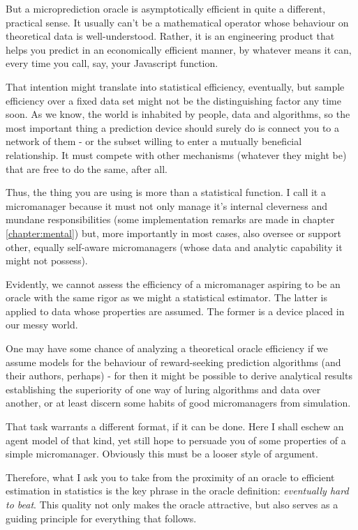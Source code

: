 But a microprediction oracle is asymptotically efficient in quite a different, practical sense. It usually can't be a mathematical operator whose behaviour on theoretical data is well-understood. Rather, it is an engineering product that helps you predict in an economically efficient manner, by whatever means it can, every time you call, say, your Javascript function. 

That intention might translate into statistical efficiency, eventually, but sample efficiency over a fixed data set might not be the distinguishing factor any time soon. As we know, the world is inhabited by people, data and algorithms, so the most important thing a prediction device should surely do is connect you to a network of them - or the subset willing to enter a mutually beneficial relationship. It must compete with other mechanisms (whatever they might be) that are free to do the same, after all. 

Thus, the thing you are using is more than a statistical function. I call it a micromanager because it must not only manage it's internal cleverness and mundane responsibilities (some implementation remarks are made in chapter \ref{chapter:mental}) but, more importantly in most cases, also oversee or support other, equally self-aware micromanagers (whose data and analytic capability it might not possess). 

Evidently, we cannot assess the efficiency of a micromanager aspiring to be an oracle with the same rigor as we might a statistical estimator. The latter is applied to data whose properties are assumed. The former is a device placed in our messy world. 

One may have some chance of analyzing a theoretical oracle efficiency if we assume models for the behaviour of reward-seeking prediction algorithms (and their authors, perhaps) - for then it might be possible to derive analytical results establishing the superiority of one way of luring algorithms and data over another, or at least discern some habits of good micromanagers from simulation. 

That task warrants a different format, if it can be done. Here I shall eschew an agent model of that kind, yet still hope to persuade you of some properties of a simple micromanager. Obviously this must be a looser style of argument. 


Therefore, what I ask you to take from the proximity of an oracle to efficient estimation in statistics is the key phrase in the oracle definition: {\em eventually hard to beat}. This quality not only makes the oracle attractive, but also serves as a guiding principle for everything that follows.

